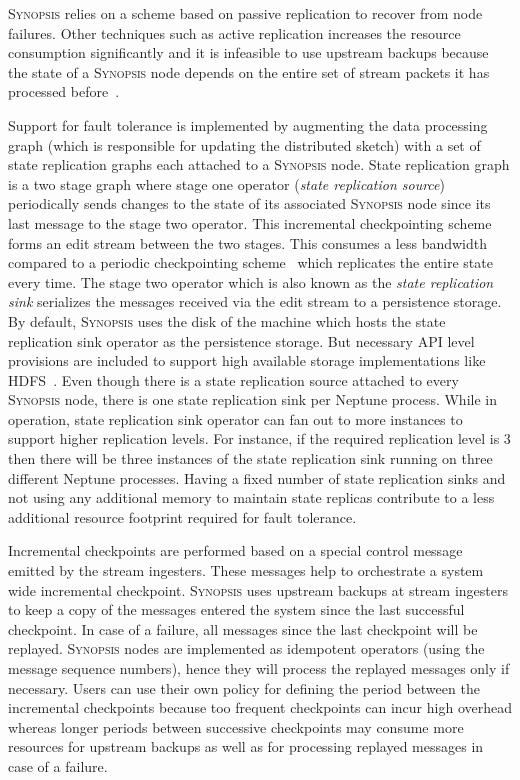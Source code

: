 \textsc{Synopsis} relies on a scheme based on passive replication to recover from node failures.
Other techniques such as active replication increases the resource consumption significantly and it is infeasible to use upstream backups because the state of a \textsc{Synopsis} node depends on the entire set of stream packets it has processed before~\cite{castro2013integrating}.

Support for fault tolerance is implemented by augmenting the data processing graph (which is responsible for updating the distributed sketch) 	with a set of state replication graphs each attached to a \textsc{Synopsis} node.
State replication graph is a two stage graph where stage one operator (\textit{state replication source}) periodically sends changes to the state of its associated \textsc{Synopsis} node since its last message to the stage two operator.
This incremental checkpointing scheme forms an edit stream between the two stages.
This consumes a less bandwidth compared to a periodic checkpointing scheme~ which replicates the entire state every time\cite{castro2013integrating}.
The stage two operator which is also known as the \textit{state replication sink} serializes the messages received via the edit stream to a persistence storage.
By default, \textsc{Synopsis} uses the disk of the machine which hosts the state replication sink operator as the persistence storage.
But necessary API level provisions are included to support high available storage implementations like HDFS~\cite{borthakur2008hdfs}.
Even though there is a state replication source attached to every \textsc{Synopsis} node, there is one state replication sink per Neptune process.
While in operation, state replication sink operator can fan out to more instances to support higher replication levels.
For instance, if the required replication level is 3 then there will be three instances of the state replication sink running on three different Neptune processes.
Having a fixed number of state replication sinks and not using any additional memory to maintain state replicas contribute to a less additional resource footprint required for fault tolerance.

Incremental checkpoints are performed based on a special control message emitted by the stream ingesters.
These messages help to orchestrate a system wide incremental checkpoint.
\textsc{Synopsis} uses upstream backups at stream ingesters to keep a copy of the messages entered the system since the last successful checkpoint.
In case of a failure, all messages since the last checkpoint will be replayed.
\textsc{Synopsis} nodes are implemented as idempotent operators (using the message sequence numbers), hence they will process the replayed messages only if necessary.
Users can use their own policy for defining the period between the incremental checkpoints because too frequent checkpoints can incur high overhead whereas longer periods between successive checkpoints may consume more resources for upstream backups as well as for processing replayed messages in case of a failure.

